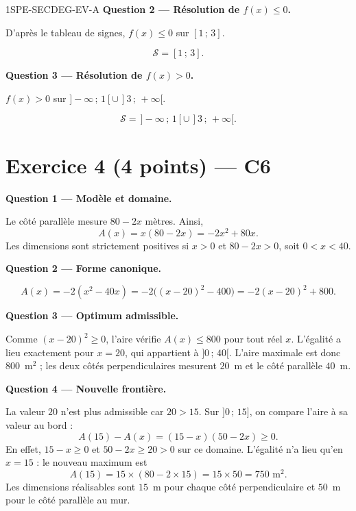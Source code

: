 \begin{corrige}{1SPE-SECDEG-EV-A}
\medskip
\textbf{Question 2 — Résolution de $f(x) \leq 0$.}

D'après le tableau de signes, $f(x) \leq 0$ sur $[1\,;\,3]$.

\[
\boxed{\mathcal{S} = [1\,;\,3].}
\]

\medskip
\textbf{Question 3 — Résolution de $f(x) > 0$.}

$f(x) > 0$ sur $]-\infty\,;\,1[ \cup \,]3\,;\,+\infty[$.

\[
\boxed{\mathcal{S} = \,]-\infty\,;\,1[ \cup \,]3\,;\,+\infty[.}
\]

\section*{Exercice 4 \hfill (4 points) — C6}


\bigskip
\textbf{Question 1 — Modèle et domaine.}


Le côté parallèle mesure $80-2x$ mètres. Ainsi,
\[A(x)=x(80-2x)=-2x^2+80x.\]
Les dimensions sont strictement positives si $x>0$ et $80-2x>0$,
soit $0<x<40$.

\medskip
\textbf{Question 2 — Forme canonique.}


\[A(x)=-2(x^2-40x)
=-2\bigl((x-20)^2-400\bigr)=-2(x-20)^2+800.\]

\medskip
\textbf{Question 3 — Optimum admissible.}

Comme $(x-20)^2\geq0$, l'aire vérifie $A(x)\leq800$ pour tout réel $x$.
L'égalité a lieu exactement pour $x=20$, qui appartient à $]0\,;\,40[$.
L'aire maximale est donc $800$~m$^2$ ; les deux côtés perpendiculaires
mesurent $20$~m et le côté parallèle $40$~m.

\medskip
\textbf{Question 4 — Nouvelle frontière.}

La valeur $20$ n'est plus admissible car $20>15$.
Sur $]0\,;\,15]$, on compare l'aire à sa valeur au bord :
\[A(15)-A(x)=(15-x)(50-2x)\geq0.\]
En effet, $15-x\geq0$ et $50-2x\geq20>0$ sur ce domaine.
L'égalité n'a lieu qu'en $x=15$ : le nouveau maximum est
\[A(15)=15\times(80-2\times15)=15\times50=750\text{ m}^2.\]
Les dimensions réalisables sont $15$~m pour chaque côté perpendiculaire
et $50$~m pour le côté parallèle au mur.

\end{corrige}

